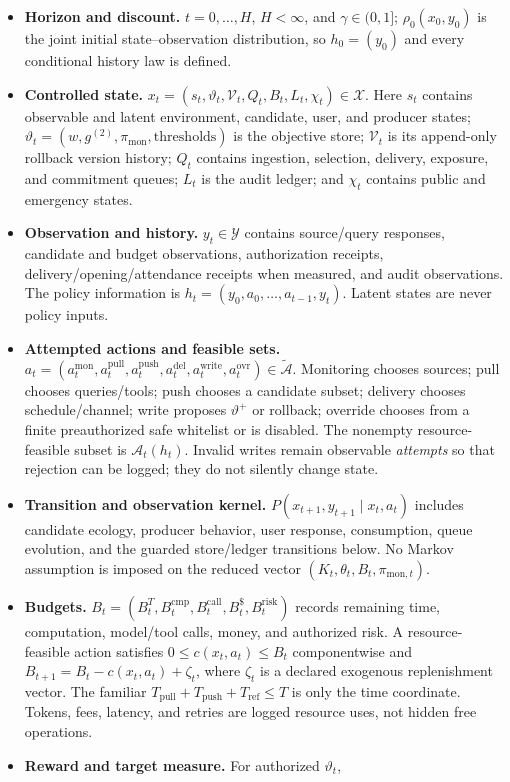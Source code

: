 \documentclass[
  11pt]{article}
\begin{document}
\begin{itemize}
\item
  \textbf{Horizon and discount.} \(t=0,\ldots,H\), \(H<\infty\), and
  \(\gamma\in(0,1]\); \(\rho_0(x_0,y_0)\) is the joint initial
  state--observation distribution, so \(h_0=(y_0)\) and every
  conditional history law is defined.
\item
  \textbf{Controlled state.}
  \(x_t=(s_t,\vartheta_t,\mathcal V_t,Q_t,B_t,L_t,\chi_t)\in\mathcal X\).
  Here \(s_t\) contains observable and latent environment, candidate,
  user, and producer states;
  \(\vartheta_t=(w,g^{(2)},\pi_{\mathrm{mon}},\mathrm{thresholds})\) is
  the objective store; \(\mathcal V_t\) is its append-only rollback
  version history; \(Q_t\) contains ingestion, selection, delivery,
  exposure, and commitment queues; \(L_t\) is the audit ledger; and
  \(\chi_t\) contains public and emergency states.
\item
  \textbf{Observation and history.} \(y_t\in\mathcal Y\) contains
  source/query responses, candidate and budget observations,
  authorization receipts, delivery/opening/attendance receipts when
  measured, and audit observations. The policy information is
  \(h_t=(y_0,a_0,\ldots,a_{t-1},y_t)\). Latent states are never policy
  inputs.
\item
  \textbf{Attempted actions and feasible sets.}
  \(a_t=(a_t^{\mathrm{mon}},a_t^{\mathrm{pull}},a_t^{\mathrm{push}},a_t^{\mathrm{del}},a_t^{\mathrm{write}},a_t^{\mathrm{ovr}})\in\widetilde{\mathcal A}\).
  Monitoring chooses sources; pull chooses queries/tools; push chooses a
  candidate subset; delivery chooses schedule/channel; write proposes
  \(\vartheta^+\) or rollback; override chooses from a finite
  preauthorized safe whitelist or is disabled. The nonempty
  resource-feasible subset is \(\mathcal A_t(h_t)\). Invalid writes
  remain observable \emph{attempts} so that rejection can be logged;
  they do not silently change state.
\item
  \textbf{Transition and observation kernel.}
  \(P(x_{t+1},y_{t+1}\mid x_t,a_t)\) includes candidate ecology,
  producer behavior, user response, consumption, queue evolution, and
  the guarded store/ledger transitions below. No Markov assumption is
  imposed on the reduced vector
  \((K_t,\theta_t,B_t,\pi_{\mathrm{mon},t})\).
\item
  \textbf{Budgets.}
  \(B_t=(B_t^T,B_t^{\mathrm{cmp}},B_t^{\mathrm{call}},B_t^{\$},B_t^{\mathrm{risk}})\)
  records remaining time, computation, model/tool calls, money, and
  authorized risk. A resource-feasible action satisfies
  \(0\le c(x_t,a_t)\le B_t\) componentwise and
  \(B_{t+1}=B_t-c(x_t,a_t)+\zeta_t\), where \(\zeta_t\) is a declared
  exogenous replenishment vector. The familiar
  \(T_{\mathrm{pull}}+T_{\mathrm{push}}+T_{\mathrm{ref}}\le T\) is only
  the time coordinate. Tokens, fees, latency, and retries are logged
  resource uses, not hidden free operations.
\item
  \textbf{Reward and target measure.} For authorized \(\vartheta_t\),


\end{itemize}
\end{document}
